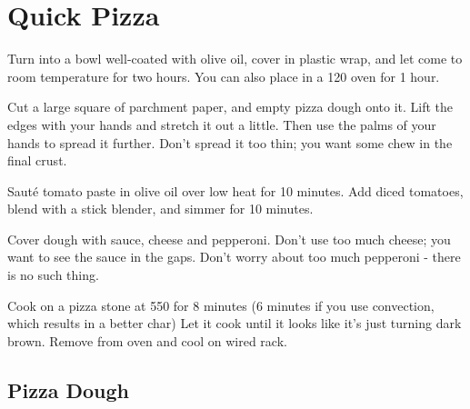 \section{Quick Pizza}
\begin{recipe}



Turn into a bowl well-coated with olive oil, cover in plastic wrap, and let
come to room temperature for two hours. You can also place in a 120\degree{} oven
for 1 hour.

Cut a large square of parchment paper, and empty pizza dough onto it. Lift the
edges with your hands and stretch it out a little. Then use the palms of your
hands to spread it further. Don't spread it too thin; you want some chew in
the final crust.


Sauté tomato paste in olive oil over low heat for 10 minutes. Add
diced tomatoes, blend with a stick blender, and simmer for 10 minutes.


Cover dough with sauce, cheese and pepperoni. Don't use too much cheese; you want
to see the sauce in the gaps. Don't worry about too much pepperoni - there is no
such thing.

Cook on a pizza stone at 550\degree{} for 8 minutes
(6 minutes if you use convection, which results in a better char)
Let it cook until it looks like it's just turning dark brown. Remove from oven
and cool on wired rack.

\subsection{Pizza Dough}


\end{recipe}
